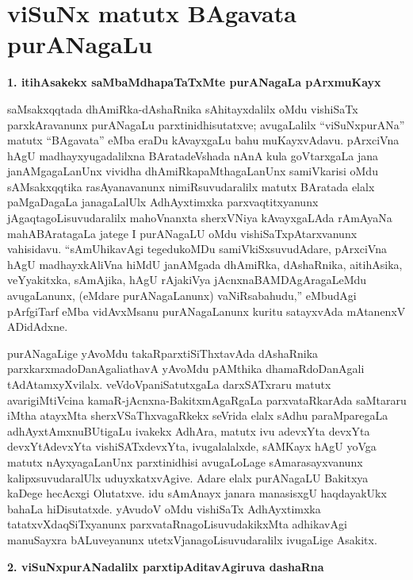 \chapter{viSuNx matutx BAgavata purANagaLu}\label{chap005}

\begin{center}
{\Large\bf 1. itihAsakekx saMbaMdhapaTaTxMte purANagaLa pArxmuKayx}
\end{center}

saMsakxqqtada dhAmiRka-dAshaRnika sAhitayxdalilx oMdu vishiSaTx parxkAravanunx purANa\-gaLu parxtinidhisutatxve; avugaLalilx ``viSuNxpurANa'' matutx ``BAgavata'' eMba eraDu kAvayx\-gaLu bahu muKayxvAdavu. pArxciVna hAgU madhayxyugadalilxna BAratadeVshada nAnA kula goVtarxgaLa jana janAMgagaLanUnx vividha dhAmiRkapaMthagaLanUnx samiVkarisi oMdu sAMsakxqqtika rasAyanavanunx nimiRsuvudaralilx matutx BAratada elalx paMgaDagaLa jana\-gaLalUlx AdhAyxtimxka parxvaqtitxyanunx jAgaqtagoLisuvudaralilx mahoVnanxta sherxVNiya kAvayx\-gaLAda rAmAyaNa mahABAratagaLa jatege I purANagaLU oMdu vishiSaTxpAtarxvanunx vahisidavu. ``sAmUhikavAgi tegedukoMDu samiVkiSxsuvudAdare, pArxciVna hAgU madhayxkAliVna hiMdU janAMgada dhAmiRka, dAshaRnika, aitihAsika, veYyakitxka, sAmAjika, hAgU rAjakiVya jAcnxnaBAMDAgAragaLeMdu avugaLanunx, (eMdare purANagaLanunx) vaNiRsabahudu,'' eMbudAgi pArfgiTarf eMba vidAvxMsanu purANagaLanunx kuritu satayxvAda mAtanenxV ADidAdxne.

purANagaLige yAvoMdu takaRparxtiSiThxtavAda dAshaRnika parxkarxmadoDanAgali\break athavA yAvoMdu pAMthika dhamaRdoDanAgali tAdAtamxyXvilalx. veVdoVpaniSatutx\-gaLa darxSATxraru matutx avarigiMtiVcina kamaR-jAcnxna-BakitxmAgaRgaLa parxvataRkarAda saMta\-raru iMtha atayxMta sherxVSaThxvagaRkekx seVrida elalx sAdhu paraMparegaLa adhAyxtAmxnuBUti\-gaLu ivakekx AdhAra, matutx ivu adevxYta devxYta devxYtAdevxYta vishiSATxdevxYta, ivugalalalxde, sAMKayx hAgU yoVga matutx nAyxyagaLanUnx parxtinidhisi avugaLoLage sAmarasayxvanunx kalipxsuvudaralUlx uduyxkatxvAgive. Adare elalx purANagaLU Bakitxya kaDege hecAcxgi Olutatxve. idu sAmAnayx janara manasisxgU haqdayakUkx bahaLa hiDisutatxde. yAvudoV oMdu vishiSaTx AdhAyxtimxka tatatxvXdaqSiTxyanunx parxvataRnagoLisuvudakikxMta adhikavAgi manuSayxra bALuveyanunx utetxVjanagoLisuvudaralilx ivugaLige Asakitx.

\bigskip
\begin{center}
{\Large\bf 2. viSuNxpurANadalilx parxtipAditavAgiruva dashaRna}
\end{center}

